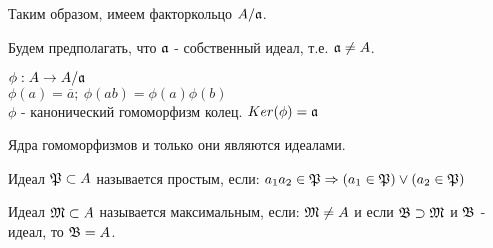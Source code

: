 Таким образом, имеем факторкольцо $A/\mathfrak{a}$.

Будем предполагать, что $\mathfrak{a}$ - собственный идеал, т.е. $\mathfrak{a} \neq A$.

\begin{thm}
$\phi: A \rightarrow A/\mathfrak{a}$ \\
$\phi(a) = \overline{a};~\phi(ab) = \phi(a)\phi(b)$ \\
$\phi$ - канонический гомоморфизм колец. $Ker(\phi) = \mathfrak{a}$
\end{thm}

\begin{thm}
Ядра гомоморфизмов и только они являются идеалами.
\end{thm}

\begin{defn}
Идеал $\mathfrak{P} \subset A$ называется простым, если: $a_1a_2 \in \mathfrak{P} \Rightarrow (a_1 \in \mathfrak{P})\vee(a_2 \in \mathfrak{P})$
\end{defn}

\begin{defn}
Идеал $\mathfrak{M} \subset A$ называется максимальным, если: $\mathfrak{M} \neq A$ и если $\mathfrak{B} \supset \mathfrak{M}$ и $\mathfrak{B}$ - идеал, то $\mathfrak{B} = A$.
\end{defn}
